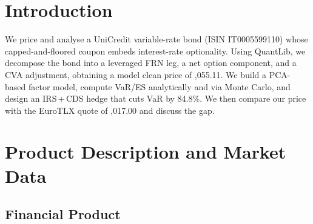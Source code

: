 \documentclass[11pt,a4paper]{article}
\begin{document}


{\pagestyle{plain}
\tableofcontents
\newpage
}

\section{Introduction}

We price and analyse a UniCredit variable-rate bond (ISIN IT0005599110) whose capped-and-floored coupon embeds interest-rate optionality.
Using QuantLib, we decompose the bond into a leveraged FRN leg, a net option component, and a CVA adjustment, obtaining a model clean price of ,055.11.
We build a PCA-based factor model, compute VaR/ES analytically and via Monte Carlo, and design an IRS\,+\,CDS hedge that cuts VaR by 84.8\%.
We then compare our price with the EuroTLX quote of ,017.00 and discuss the  gap.

\section{Product Description and Market Data}

\subsection{Financial Product}
\end{document}
